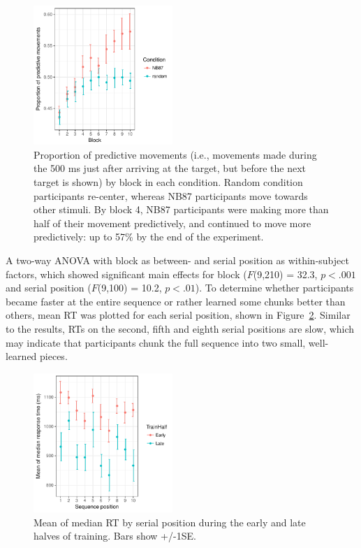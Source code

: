 \documentclass[man,floatsintext]{apa6}
\begin{document}
\begin{figure}[!h]
  \centering
  \includegraphics[width=0.47\textwidth]{figures/exp1_predictive_moves_vs_block}
  \caption{\small{Proportion of predictive movements (i.e., movements made during the 500 ms just after arriving at the target, but before the next target is shown) by block in each condition. Random condition participants re-center, whereas NB87 participants move towards other stimuli. By block 4, NB87 participants were making more than half of their movement predictively, and continued to move more predictively: up to 57\% by the end of the experiment.}}
  \label{fig:predict}
\end{figure} 

A two-way ANOVA with block as between- and serial position as within-subject factors, which showed significant main effects for block ($F$(9,210) = 32.3, $p<.001$ and serial position ($F$(9,100) = 10.2, $p<.01$). To determine whether participants became faster at the entire sequence or rather learned some chunks better than others, mean RT was plotted for each serial position, shown in Figure~\ref{fig:Seqpos}. Similar to the  results, RTs on the second, fifth and eighth serial positions are slow, which may indicate that participants chunk the full sequence into two small, well-learned pieces.

\begin{figure}[!h]
  \centering
  \includegraphics[width=0.47\textwidth]{figures/exp1_RT_by_sequence_position}
  \caption{Mean of median RT by serial position during the early and late halves of training. Bars show +/-1SE.}
  \label{fig:Seqpos}
\end{figure} 
\end{document}
